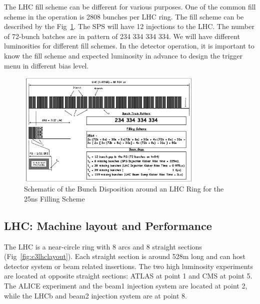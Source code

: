 The LHC fill scheme can be different for various purposes. One of the common fill scheme in the operation is 2808 bunches per LHC ring. The fill scheme can be described by the Fig~\ref{fig:c3lhcfillscheme}. The SPS will have 12 injections to the LHC. The number of 72-bunch batches are in pattern of 234 334 334 334. We will have different luminosities for different fill schemes. In the detector operation, it is important to know the fill scheme and expected luminosity in advance to design the trigger menu in different bias level. 

\begin{figure}[htbp]
 \begin{center}
  \includegraphics[width=0.8\textwidth]{figures/c3/c3_lhc_fillscheme.png}
 \end{center}
 \caption{Schematic of the Bunch Disposition around an LHC Ring for the 25ns Filling Scheme}
 \label{fig:c3lhcfillscheme}
\end{figure}

\clearpage
\subsection{LHC: Machine layout and Performance}

The LHC is a near-circle ring with 8 arcs and 8 straight sections (Fig~\ref{fig:c3lhclayout}). Each straight section is around 528m long and can host detector system or beam related insertions. The two high luminosity experiments are located at opposite straight sections: ATLAS at point 1 and CMS at point 5. The ALICE experiment and the beam1 injection system are located at point 2, while the LHCb and beam2 injection system are at point 8. 

